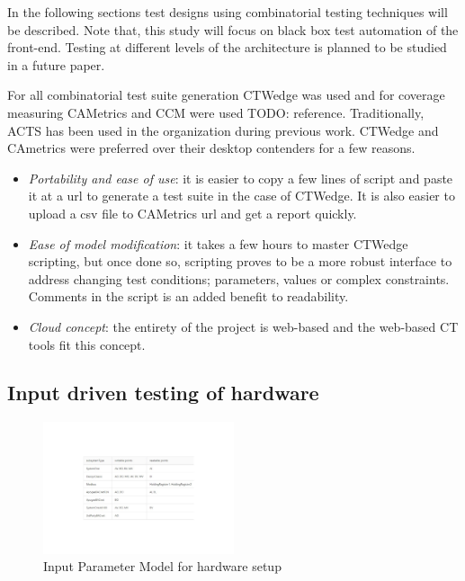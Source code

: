 \documentclass[conference]{IEEEtran}
\newcommand{\todo}[1]{}
\renewcommand{\todo}[1]{{\color{red} TODO: {#1}}}
\begin{document}
	In the following sections test designs using combinatorial testing techniques will be described. 
	Note that, this study will focus on black box test automation of the front-end. Testing at different levels of the architecture is planned to be studied in a future paper.

	For all combinatorial test suite generation CTWedge was used and for coverage measuring CAMetrics and CCM were used \todo{reference}.
	Traditionally, ACTS has been used in the organization during previous work.
	CTWedge and CAmetrics were preferred over their desktop contenders for a few reasons.

	\begin{itemize}
		\item \textit{Portability and ease of use}: it is easier to copy a few lines of script and paste it at a url to generate a test suite in the case of CTWedge. It is also easier to upload a csv file to CAMetrics url and get a report quickly.
		\item \textit{Ease of model modification}: it takes a few hours to master CTWedge scripting, but once done so, scripting proves to be a more robust interface to address changing test conditions; parameters, values or complex constraints. Comments in the script is an added benefit to readability. 
		\item \textit{Cloud concept}: the entirety of the project is web-based and the web-based CT tools fit this concept.
	\end{itemize}
	
	\subsection{Input driven testing of hardware}

	\begin{figure}[!t]
		\includegraphics[width=0.50\textwidth,]{commandingIPM.pdf}
		\caption{Input Parameter Model for hardware setup}
		\label{fig:commandingIPM}
	\end{figure}
\end{document}
